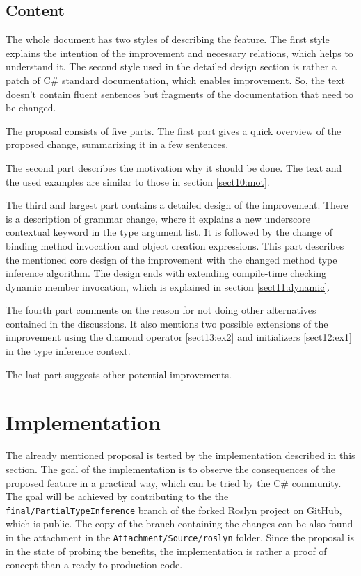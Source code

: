 \subsection{Content}

The whole document has two styles of describing the feature. 
The first style explains the intention of the improvement and necessary relations, which helps to understand it. 
The second style used in the detailed design section is rather a patch of C\# standard documentation, which enables improvement. 
So, the text doesn’t contain fluent sentences but fragments of the documentation that need to be changed.
\par
The proposal consists of five parts. 
The first part gives a quick overview of the proposed change, summarizing it in a few sentences.
\par
The second part describes the motivation why it should be done. The text
and the used examples are similar to those in section \ref{sect10:mot}.
\par
The third and largest part contains a detailed design of the improvement. 
There is a description of grammar change, where it explains a new underscore contextual keyword in the type argument list. 
It is followed by the change of binding method invocation and object creation expressions. 
This part describes the mentioned core design of the improvement with the changed method type inference algorithm. 
The design ends with extending compile-time checking dynamic member invocation, which is explained in section \ref{sect11:dynamic}.
\par
The fourth part comments on the reason for not doing other alternatives contained in the discussions. 
It also mentions two possible extensions of the improvement using the diamond operator \ref{sect13:ex2} and initializers \ref{sect12:ex1} in the type inference context.
\par
The last part suggests other potential improvements.

\section{Implementation}

The already mentioned proposal is tested by the implementation described in this section. 
The goal of the implementation is to observe the consequences of the proposed feature in a practical way, which can be tried by the C\# community. 
The goal will be achieved by contributing to the the \texttt{final/PartialTypeInference} branch \cite{online:roslynFork} of the forked Roslyn project on GitHub, which is public.
The copy of the branch containing the changes can be also found in the attachment in the \texttt{Attachment/Source/roslyn} folder. 
Since the proposal is in the state of probing the benefits, the implementation is rather a proof of concept than a ready-to-production code.

